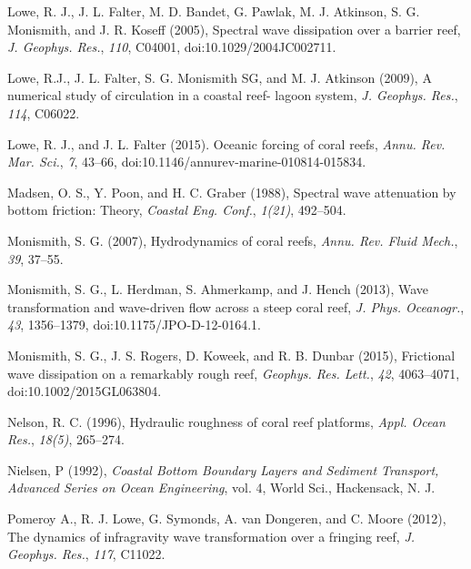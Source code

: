 \documentclass[default,jgrga]{agutex2015}
\begin{document}
\begin{article}
\begin{thebibliography}{}
Lowe, R. J., J. L. Falter, M. D. Bandet, G. Pawlak, M. J. Atkinson, S. G. Monismith, and J. R. Koseff (2005), Spectral wave dissipation over a barrier reef, \textit{J. Geophys. Res.}, \textit{110}, C04001, doi:10.1029/2004JC002711.

Lowe, R.J., J. L. Falter, S. G. Monismith SG, and M. J. Atkinson (2009), A numerical study of circulation in a coastal reef-
lagoon system, \textit{J. Geophys. Res.}, \textit{114}, C06022.

Lowe, R. J., and J. L. Falter (2015). Oceanic forcing of coral reefs, \textit{Annu. Rev. Mar. Sci.}, \textit{7}, 43--66, doi:10.1146/annurev-marine-010814-015834.

Madsen, O. S., Y. Poon, and H. C. Graber (1988), Spectral wave attenuation by bottom friction: Theory, \textit{Coastal Eng. Conf.}, \textit{1(21)}, 492--504.

Monismith, S. G. (2007), Hydrodynamics of coral reefs, \textit{Annu. Rev. Fluid Mech.}, \textit{39}, 37--55.

Monismith, S. G., L. Herdman, S. Ahmerkamp, and J. Hench (2013), Wave transformation and wave-driven flow across a steep coral reef, \textit{J. Phys. Oceanogr.}, \textit{43}, 1356--1379, doi:10.1175/JPO-D-12-0164.1.

Monismith, S. G., J. S. Rogers, D. Koweek, and R. B. Dunbar (2015), Frictional wave dissipation on a remarkably rough reef, \textit{Geophys. Res. Lett.}, \textit{42}, 4063--4071, doi:10.1002/2015GL063804.

Nelson, R. C. (1996), Hydraulic roughness of coral reef platforms, \textit{Appl. Ocean Res.}, \textit{18(5)}, 265--274.

Nielsen, P (1992), \textit{Coastal Bottom Boundary Layers and Sediment Transport, Advanced Series on Ocean Engineering}, vol. 4, World Sci., Hackensack, N. J.

Pomeroy A., R. J. Lowe, G. Symonds, A. van Dongeren,  and C. Moore (2012), The dynamics of infragravity wave
transformation over a fringing reef, \textit{J. Geophys. Res.}, \textit{117}, C11022.


\end{thebibliography}
\end{article}
\end{document}
